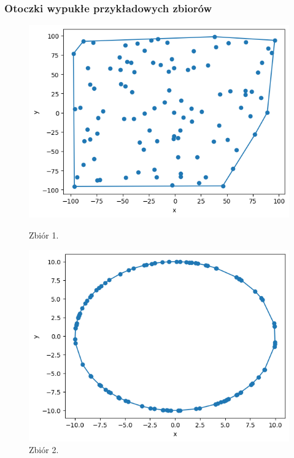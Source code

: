 \documentclass[11pt]{scrartcl}
\begin{document}
    \subsubsection{Otoczki wypukłe przykładowych zbiorów}
    \begin{figure}[H]
        \centering
        \begin{minipage}{0.45\linewidth}
          \centering
          \includegraphics[width=1\linewidth]{2_5.png}
          \caption{Zbiór 1.}
        \end{minipage}
        \begin{minipage}{0.45\linewidth}
          \centering
          \includegraphics[width=1\linewidth]{2_6.png}
          \caption{Zbiór 2.}
        \end{minipage}
    \end{figure}
\end{document}
